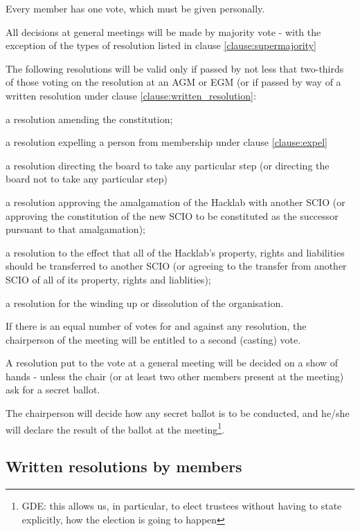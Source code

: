 \documentclass{article}
\begin{document}
\clause Every member has one vote, which must be given personally.

\clause All decisions at general meetings will be made by majority
vote - with the exception of the types of resolution listed in clause
\ref{clause:supermajority} 

\clause The following resolutions will be valid only if passed by not
less that two-thirds of those voting on the resolution at an AGM or
EGM (or if passed by way of a written resolution under clause
\ref{clause:written_resolution}:

\subclause a resolution amending the constitution;

\subclause a resolution expelling a person from membership under
clause \ref{clause:expel}

\subclause a resolution directing the board to take any particular
step (or directing the board not to take any particular step)

\subclause a resolution approving the amalgamation of the Hacklab with
another SCIO (or approving the constitution of the new SCIO to be
constituted as the successor pursuant to that amalgamation);

\subclause a resolution to the effect that all of the Hacklab's
property, rights and liabilities should be transferred to another SCIO
(or agreeing to the transfer from another SCIO of all of its property,
rights and liablities);

\subclause a resolution for the winding up or dissolution of the
organisation.

\clause If there is an equal number of votes for and against any
resolution, the chairperson of the meeting will be entitled to a
second (casting) vote.

\clause A resolution put to the vote at a general meeting will be
decided on a show of hands - unless the chair (or at least two other
members present at the meeting) ask for a secret ballot.

\clause The chairperson will decide how any secret ballot is to be
conducted, and he/she will declare the result of the ballot at the
meeting\footnote{GDE: this allows us, in particular, to elect trustees
  without having to state explicitly, how the election is going to happen}.

\subsection{Written resolutions by members}
\end{document}
